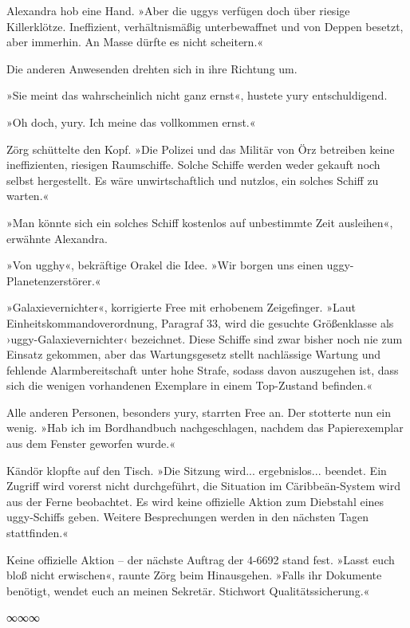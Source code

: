 Alexandra hob eine Hand. »Aber die uggys verfügen doch über riesige Killerklötze. Ineffizient, verhältnismäßig unterbewaffnet und von Deppen besetzt, aber immerhin. An Masse dürfte es nicht scheitern.«

Die anderen Anwesenden drehten sich in ihre Richtung um.

»Sie meint das wahrscheinlich nicht ganz ernst«, hustete yury entschuldigend.

»Oh doch, yury. Ich meine das vollkommen ernst.«

Zörg schüttelte den Kopf. »Die Polizei und das Militär von Örz betreiben keine ineffizienten, riesigen Raumschiffe. Solche Schiffe werden weder gekauft noch selbst hergestellt. Es wäre unwirtschaftlich und nutzlos, ein solches Schiff zu warten.«

»Man könnte sich ein solches Schiff kostenlos auf unbestimmte Zeit ausleihen«, erwähnte Alexandra.

»Von ugghy«, bekräftige Orakel die Idee. »Wir borgen uns einen uggy-Planetenzerstörer.«

»Galaxievernichter«, korrigierte Free mit erhobenem Zeigefinger. »Laut Einheitskommandoverordnung, Paragraf 33, wird die gesuchte Größenklasse als ›uggy-Galaxievernichter‹ bezeichnet. Diese Schiffe sind zwar bisher noch nie zum Einsatz gekommen, aber das Wartungsgesetz stellt nachlässige Wartung und fehlende Alarmbereitschaft unter hohe Strafe, sodass davon auszugehen ist, dass sich die wenigen vorhandenen Exemplare in einem Top-Zustand befinden.«

Alle anderen Personen, besonders yury, starrten Free an. Der stotterte nun ein wenig. »Hab ich im Bordhandbuch nachgeschlagen, nachdem das Papierexemplar aus dem Fenster geworfen wurde.«

Kändör klopfte auf den Tisch. »Die Sitzung wird... ergebnislos... beendet. Ein Zugriff wird vorerst nicht durchgeführt, die Situation im Cäribbeän-System wird aus der Ferne beobachtet. Es wird keine offizielle Aktion zum Diebstahl eines uggy-Schiffs geben. Weitere Besprechungen werden in den nächsten Tagen stattfinden.«

Keine offizielle Aktion – der nächste Auftrag der 4-6692 stand fest. »Lasst euch bloß nicht erwischen«, raunte Zörg beim Hinausgehen. »Falls ihr Dokumente benötigt, wendet euch an meinen Sekretär. Stichwort Qualitätssicherung.«

\begin{center}
∞∞∞
\end{center}

